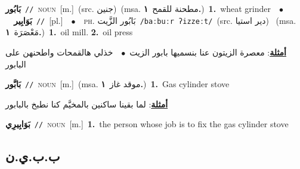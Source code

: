 \documentclass[10pt,a4paper,twoside]{article} %
\begin{document}
\begin{multicols}{2}
{\setlength\topsep{0pt}\textbf{\foreignlanguage{arabic}{بَابُور}}\ {\color{gray}\texttt{//}\color{black}}\ \textsc{noun}\ [m.]\ (src. \color{gray}\foreignlanguage{arabic}{جنين}\color{black})\ \color{gray}(msa. \foreignlanguage{arabic}{مطحنة للقمح}~\foreignlanguage{arabic}{\textbf{١.}})\color{black}\ \textbf{1.}~wheat grinder\ \ $\bullet$\ \ \setlength\topsep{0pt}\textbf{\foreignlanguage{arabic}{بَوَابِير}}\ {\color{gray}\texttt{//}\color{black}}\ [pl.]\ \ $\bullet$\ \ \textsc{ph.} \color{gray} \foreignlanguage{arabic}{بَابُور الزَّيت}\color{black}\ {\color{gray}\texttt{/{\sffamily baːbuːr ʔizzeːt}/}\color{black}}\ \color{gray}(src. \foreignlanguage{arabic}{دير استيا})\color{black}\ \color{gray} (msa. \foreignlanguage{arabic}{مَعْصَرَة}~\foreignlanguage{arabic}{\textbf{١.}})\color{black}\ \textbf{1.}~oil mill.  \textbf{2.}~oil press\  \begin{flushright}\color{gray}\foreignlanguage{arabic}{\textbf{\underline{\foreignlanguage{arabic}{أمثلة}}}: معصرة الزيتون عنا بنسميها بابور الزيت\ $\bullet$\ \  خذلي هالقمحات واطحنهن على البابور}\end{flushright}\color{black}} \vspace{2mm}

{\setlength\topsep{0pt}\textbf{\foreignlanguage{arabic}{بَابَّور}}\ {\color{gray}\texttt{//}\color{black}}\ \textsc{noun}\ [m.]\ \color{gray}(msa. \foreignlanguage{arabic}{موقد غاز}~\foreignlanguage{arabic}{\textbf{١.}})\color{black}\ \textbf{1.}~Gas cylinder stove\  \begin{flushright}\color{gray}\foreignlanguage{arabic}{\textbf{\underline{\foreignlanguage{arabic}{أمثلة}}}: لما بقينا ساكنين بالمخيَّم كنا نطبخ بالبابور}\end{flushright}\color{black}} \vspace{2mm}

{\setlength\topsep{0pt}\textbf{\foreignlanguage{arabic}{بَوَابِيرِي}}\ {\color{gray}\texttt{//}\color{black}}\ \textsc{noun}\ [m.]\ \textbf{1.}~the person whose job is to fix the gas cylinder stove\ 

\vspace{-3mm}
\subsection*{\color{blue}\foreignlanguage{arabic}{ب.ب.ي.ن}\color{blue}{ (ntws)}} 

}
\end{multicols}
\end{document}
